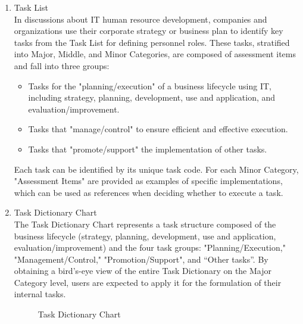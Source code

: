 \begin{enumerate}
\item Task List \\
In discussions about IT human resource development, companies and organizations use their corporate strategy or business plan to identify key tasks from the Task List for defining personnel roles. 
These tasks, stratified into Major, Middle, and Minor Categories, are composed of assessment items and fall into three groups:
\begin{itemize}
\renewcommand\labelitemi{-}
\item Tasks for the "planning/execution" of a business lifecycle using IT, including strategy, planning, development, use and application, and evaluation/improvement.
\newpage
\item Tasks that "manage/control" to ensure efficient and effective execution.
\item Tasks that "promote/support" the implementation of other tasks.
\end{itemize}
Each task can be identified by its unique task code. For each Minor Category, "Assessment Items" are provided as examples of specific implementations, which can be used as references when deciding whether to execute a task.

\item Task Dictionary Chart \\
The Task Dictionary Chart represents a task structure composed of the business lifecycle (strategy,
planning, development, use and application, evaluation/improvement) and the four task groups:
"Planning/Execution," "Management/Control," "Promotion/Support", and “Other tasks”. By obtaining a
bird's-eye view of the entire Task Dictionary on the Major Category level, users are expected to apply it for
the formulation of their internal tasks.
\begin{figure}[H]
    \centering
    \caption{ Task Dictionary Chart }
    \label{fig:task_Dictionary_Chart}
\end{figure}


\end{enumerate}
